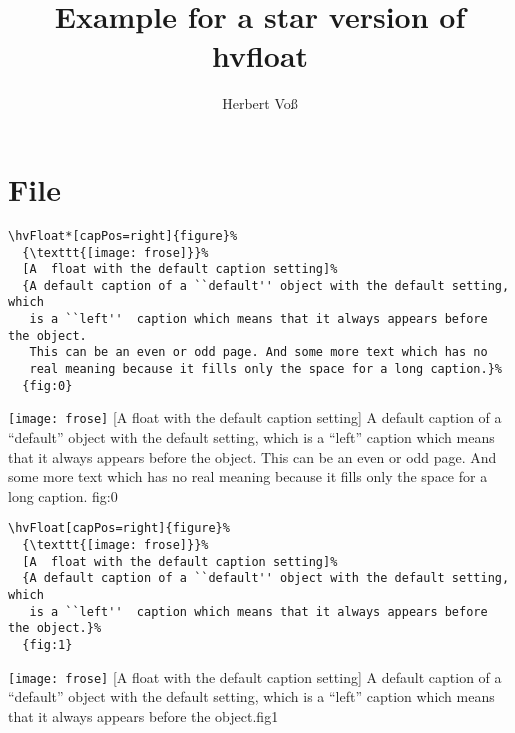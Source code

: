 \documentclass[twocolumn]{scrartcl}
\begin{document}
\title{Example for a star version of  hvfloat}
\author{Herbert Voß}
\maketitle

\tableofcontents

\Blindtext

\section{File \texttt{\jobname}}

\begin{lstlisting}
\hvFloat*[capPos=right]{figure}%
  {\texttt{[image: frose]}}%
  [A  float with the default caption setting]%
  {A default caption of a ``default'' object with the default setting, which
   is a ``left''  caption which means that it always appears before the object.
   This can be an even or odd page. And some more text which has no
   real meaning because it fills only the space for a long caption.}%
  {fig:0}
\end{lstlisting}

%
  {\texttt{[image: frose]}}%
  [A  float with the default caption setting]%
  {A default caption of a ``default'' object with the default setting, which
   is a ``left''  caption which means that it always appears before the object.
   This can be an even or odd page. And some more text which has no
   real meaning because it fills only the space for a long caption.}%
  {fig:0}

\blinddocument

\blindtext

\begin{lstlisting}
\hvFloat[capPos=right]{figure}%
  {\texttt{[image: frose]}}%
  [A  float with the default caption setting]%
  {A default caption of a ``default'' object with the default setting, which
   is a ``left''  caption which means that it always appears before the object.}%
  {fig:1}
\end{lstlisting}

\Float[default]
%
  {\texttt{[image: frose]}}%
  [A  float with the default caption setting]%
  {A default caption of a ``default'' object with the default setting, which
   is a ``left''  caption which means that it always appears before the object.}{fig1}

\blinddocument

\Blindtext

\blindtext
\end{document}

